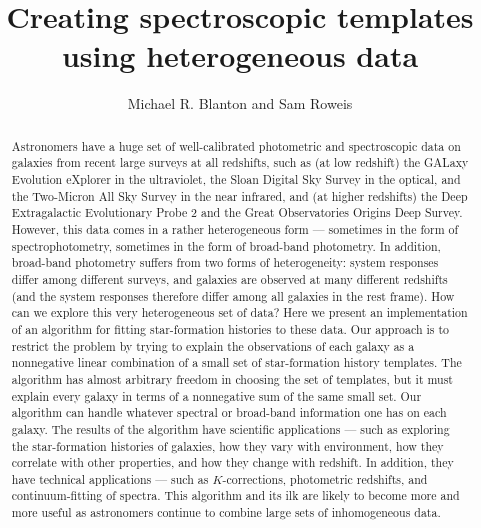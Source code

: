 \documentclass[10pt,preprint]{aastex}
\newcounter{address}
\begin{document}
\title{ Creating spectroscopic templates using heterogeneous data}

\author{
Michael R. Blanton\altaffilmark{\ref{NYU}} and 
Sam Roweis\altaffilmark{\ref{NYU}}}

\setcounter{address}{1}
\clearpage

\begin{abstract}
Astronomers have a huge set of well-calibrated photometric and
spectroscopic data on galaxies from recent large surveys at all
redshifts, such as (at low redshift) the GALaxy Evolution eXplorer in
the ultraviolet, the Sloan Digital Sky Survey in the optical, and the
Two-Micron All Sky Survey in the near infrared, and (at higher
redshifts) the Deep Extragalactic Evolutionary Probe 2 and the Great
Observatories Origins Deep Survey.  However, this data comes in a
rather heterogeneous form --- sometimes in the form of
spectrophotometry, sometimes in the form of broad-band photometry. In
addition, broad-band photometry suffers from two forms of
heterogeneity: system responses differ among different surveys, and
galaxies are observed at many different redshifts (and the system
responses therefore differ among all galaxies in the rest frame).  How
can we explore this very heterogeneous set of data?  Here we present
an implementation of an algorithm for fitting star-formation histories
to these data. Our approach is to restrict the problem by trying to
explain the observations of each galaxy as a nonnegative linear
combination of a small set of star-formation history templates.  The
algorithm has almost arbitrary freedom in choosing the set of
templates, but it must explain every galaxy in terms of a nonnegative
sum of the same small set.  Our algorithm can handle whatever spectral
or broad-band information one has on each galaxy.  The results of the
algorithm have scientific applications --- such as exploring the
star-formation histories of galaxies, how they vary with environment,
how they correlate with other properties, and how they change with
redshift. In addition, they have technical applications --- such as
$K$-corrections, photometric redshifts, and continuum-fitting of
spectra. This algorithm and its ilk are likely to become more and more
useful as astronomers continue to combine large sets of inhomogeneous
data.
\end{abstract}

\end{document}
